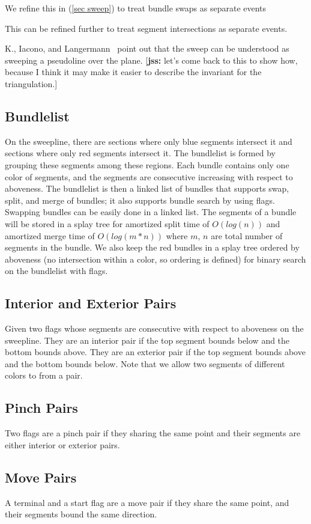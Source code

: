 \documentclass[11pt]{article}
\def\jss#1{{\footnotesize [{\bf jss:} #1]}}
\begin{document}
We refine this in (\ref{sec sweep}) to treat bundle swaps as separate events

This can be refined further to treat segment intersections as separate events. 

K., Iacono, and Langermann~\cite{}  point out that the sweep can be understood as sweeping a pseudoline over the plane.  \jss{let's come back to this to show how, because I think it may make it easier to describe the invariant for the triangulation.}

\subsection{Bundlelist}
On the sweepline, there are sections where only blue segments intersect it and sections where only red segments intersect it. 
The bundlelist is formed by grouping these segments among these regions.
Each bundle contains only one color of segments, and the segments are consecutive increasing with respect to aboveness.
The bundlelist is then a linked list of bundles that supports swap, split, and merge of bundles; it also supports bundle search by using flags.
Swapping bundles can be easily done in a linked list.
The segments of a bundle will be stored in a splay tree for amortized split time of $O(log(n))$ and amortized merge time of $O(log(m*n))$ where $m$, $n$ are total number of segments in the bundle.
We also keep the red bundles in a splay tree ordered by aboveness (no intersection within a color, so ordering is defined) for binary search on the bundlelist with flags.

\subsection{Interior and Exterior Pairs}
Given two flags whose segments are consecutive with respect to aboveness on the sweepline.
They are an interior pair if the top segment bounds below and the bottom bounds above.
They are an exterior pair if the top segment bounds above and the bottom bounds below.
Note that we allow two segments of different colors to from a pair.

\subsection{Pinch Pairs}
Two flags are a pinch pair if they sharing the same point and their segments are either interior or exterior pairs.

\subsection{Move Pairs}
A terminal and a start flag are a move pair if they share the same point, and their segments bound the same direction.
\end{document}

